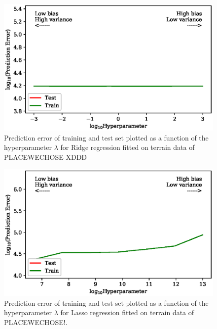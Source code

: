 \documentclass[a4paper, 10pt]{article}
\begin{document}
\begin{figure}[H]
    \includegraphics{figs/biasvariancetradeoff_Ridge_terrain.eps}
    \caption{Prediction error of training and test set plotted as a function of the hyperparameter $\lambda$ for Ridge regression fitted on terrain data of PLACEWECHOSE XDDD}
    \label{fig:bias_ridge_terrain}
\end{figure}    

\begin{figure}[H]
    \includegraphics{figs/biasvariancetradeoff_LASSO_terrain.eps}
    \caption{Prediction error of training and test set plotted as a function of the hyperparameter $\lambda$ for Lasso regression fitted on terrain data of PLACEWECHOSE!.}
    \label{fig:bias_lasso_terrain}
\end{figure} 
\end{document}
